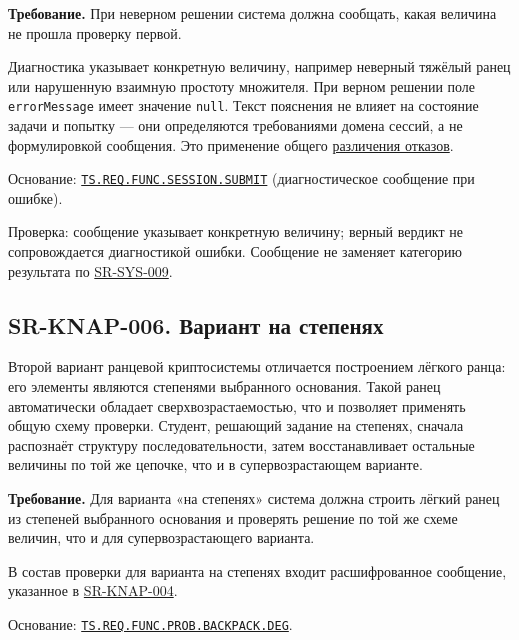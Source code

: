 \documentclass[12pt,a4paper]{article}
\begin{document}
\textbf{Требование.} При неверном решении система должна сообщать, какая величина не прошла проверку первой.

Диагностика указывает конкретную величину, например неверный тяжёлый ранец или нарушенную взаимную простоту множителя. При верном решении поле \texttt{errorMessage} имеет значение \texttt{null}. Текст пояснения не влияет на состояние задачи и попытку --- они определяются требованиями домена сессий, а не формулировкой сообщения. Это применение общего {\hyperlink{sr-sys-009-различение-отказов}{различения отказов}}.

Основание: {\href{../02\_Техническое\_задание/Техническое\_задание.pdf\#ts-req-func-session-submit}{\texttt{TS.\allowbreak{}REQ.\allowbreak{}FUNC.\allowbreak{}SESSION.\allowbreak{}SUBMIT}}} (диагностическое сообщение при ошибке).

Проверка: сообщение указывает конкретную величину; верный вердикт не сопровождается диагностикой ошибки. Сообщение не заменяет категорию результата по {\hyperlink{sr-sys-009}{SR-SYS-009}}.

\subsection{SR-KNAP-006. Вариант на степенях}\label{sr-knap-006-ux432ux430ux440ux438ux430ux43dux442-ux43dux430-ux441ux442ux435ux43fux435ux43dux44fux445}

\hypertarget{sr-knap-006-вариант-на-степенях}{}

\hypertarget{sr-knap-006}{}

Второй вариант ранцевой криптосистемы отличается построением лёгкого ранца: его элементы являются степенями выбранного основания. Такой ранец автоматически обладает сверхвозрастаемостью, что и позволяет применять общую схему проверки. Студент, решающий задание на степенях, сначала распознаёт структуру последовательности, затем восстанавливает остальные величины по той же цепочке, что и в супервозрастающем варианте.

\textbf{Требование.} Для варианта «на степенях» система должна строить лёгкий ранец из степеней выбранного основания и проверять решение по той же схеме величин, что и для супервозрастающего варианта.

В состав проверки для варианта на степенях входит расшифрованное сообщение, указанное в {\hyperlink{sr-knap-004}{SR-KNAP-004}}.

Основание: {\href{../02\_Техническое\_задание/Техническое\_задание.pdf\#ts-req-func-prob-backpack-deg}{\texttt{TS.\allowbreak{}REQ.\allowbreak{}FUNC.\allowbreak{}PROB.\allowbreak{}BACKPACK.\allowbreak{}DEG}}}.
\end{document}
